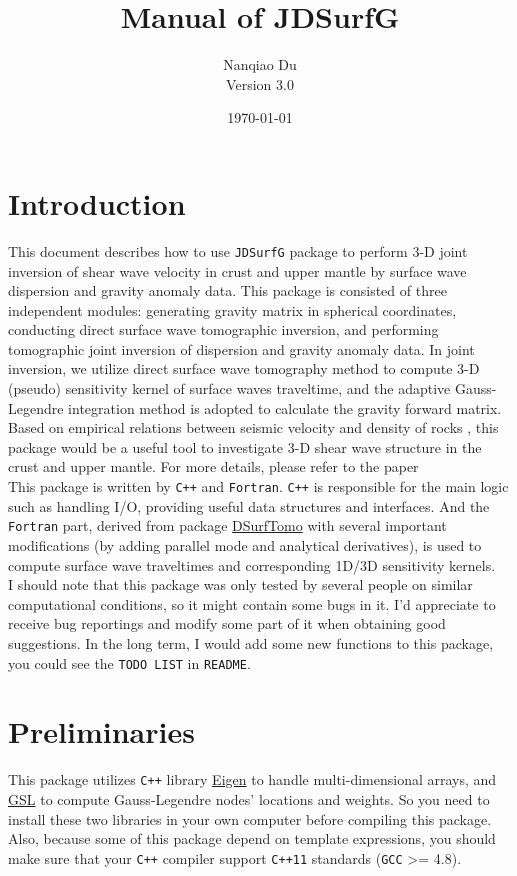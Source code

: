 \documentclass[UTF8]{article}
\title{\textbf{Manual of JDSurfG}}
\author{Nanqiao Du \\ Version 3.0}
\date{\today}
\begin{document}
\maketitle
\tableofcontents
\newpage


\section{Introduction}
This document describes how to use \texttt{JDSurfG} package 
to perform 3-D joint inversion of shear wave velocity
in crust and upper mantle by surface wave dispersion and
gravity anomaly data. This package is consisted of three
independent modules: generating gravity matrix in spherical
coordinates, conducting direct surface wave tomographic 
inversion, and performing tomographic joint inversion of 
dispersion and gravity anomaly data. In joint inversion, we
utilize direct surface wave tomography method \citep{Fang2015}
to compute 3-D (pseudo) sensitivity kernel of surface waves
traveltime, and the adaptive Gauss-Legendre integration 
method \citep{RN35} is adopted to calculate the gravity 
forward matrix. Based on empirical relations between seismic
velocity and density of rocks \citep{Brocher05}, this 
package would be a useful tool to investigate 3-D shear 
wave structure in the crust and upper mantle. For more details, 
please refer to the paper \citep{Du2021} \\

This package is written by \texttt{C++} and \texttt{Fortran}.
\texttt{C++} is responsible for the main logic such as 
handling I/O, providing useful data structures and 
interfaces. And the \texttt{Fortran} part, derived from 
package \href{https://github.com/HongjianFang/DSurfTomo/tree/stable/src}{DSurfTomo}
with several important modifications (by adding 
parallel mode and analytical derivatives), is used to 
compute surface wave traveltimes and corresponding 1D/3D 
sensitivity kernels.\\

I should note that this package was only tested by 
several people on similar computational conditions, 
so it might contain some bugs in it. I'd appreciate 
to receive bug reportings and modify some part of 
it when obtaining good suggestions. In the long term, 
I would add some new functions to this package, 
you could see the \texttt{TODO LIST} in \texttt{README}.

\section{Preliminaries}
This package utilizes \texttt{C++} library \href{http://eigen.tuxfamily.org/index.php?title=Main_Page}{Eigen}
to handle multi-dimensional arrays, and \href{http://www.gnu.org/software/gsl/}{GSL}
to compute Gauss-Legendre nodes' locations and weights. So you need 
to install these two libraries in your own computer before
compiling this package. Also, because some of this package
depend on template expressions, you should make sure
that your \texttt{C++} compiler support \texttt{C++11}
standards (\texttt{GCC} >= 4.8).
\end{document}
